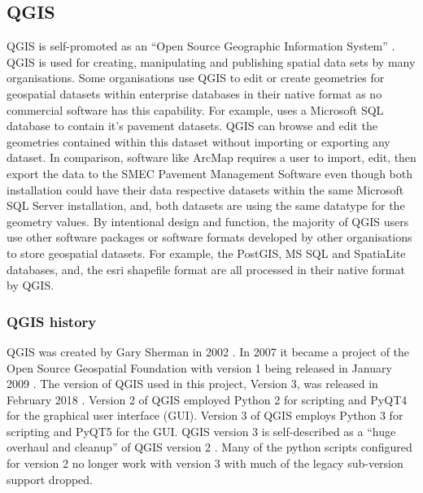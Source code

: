 \documentclass[letterpaper,11pt,english]{sphinxmanual}
\begin{document}
\subsection{QGIS}
\label{\detokenize{concept:qgis}}
QGIS is self-promoted as an “Open Source Geographic Information System” .  QGIS is used for creating, manipulating and publishing spatial data sets by many organisations.  Some organisations use QGIS to edit or create geometries for geospatial datasets within enterprise databases in their native format as no commercial software has this capability.  For example,  uses a Microsoft SQL database to contain it’s pavement datasets.  QGIS can browse and edit the geometries contained within this dataset without importing or exporting any dataset.   In comparison, software like ArcMap requires a user to import, edit, then export the data to the SMEC Pavement Management Software even though both installation could have their data respective datasets within the same Microsoft SQL Server installation, and, both datasets are using the same datatype for the geometry values.
By intentional design and function, the majority of QGIS users use other software packages or software formats developed by other organisations to store geospatial datasets.  For example, the PostGIS, MS SQL and SpatiaLite databases, and, the esri shapefile format are all processed in their native format by QGIS.


\subsubsection{QGIS history}
\label{\detokenize{concept:qgis-history}}
QGIS was created by Gary Sherman in 2002 .  In 2007 it became a project of the Open Source Geospatial Foundation with version 1 being released in January 2009 .  The version of QGIS used in this project, Version 3, was released in February 2018 .  Version 2 of QGIS employed Python 2 for scripting and PyQT4 for the graphical user interface (GUI).  Version 3 of QGIS employs Python 3 for scripting and PyQT5 for the GUI.  QGIS version 3 is self-described as a “huge overhaul and cleanup” of QGIS version 2 .  Many of the python scripts configured for version 2 no longer work with version 3 with much of the legacy sub-version support dropped.
\end{document}
